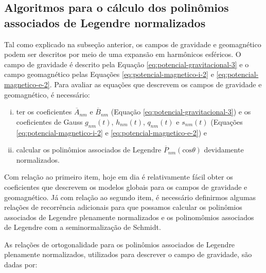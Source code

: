 \documentclass[10pt,a4paper,fleqn]{article}
\begin{document}
\subsection{Algoritmos para o c\'{a}lculo dos polin\^{o}mios associados de Legendre normalizados}

Tal como explicado na subse\c{c}\~{a}o anterior, os campos de gravidade e geomagn\'{e}tico
podem ser descritos por meio de uma expans\~{a}o em harm\^{o}nicos esf\'{e}ricos.
O campo de gravidade \'{e} descrito pela Equa\c{c}\~{a}o \ref{eq:potencial-gravitacional-3} e
o campo geomagn\'{e}tico pelas Equa\c{c}\~{o}es \ref{eq:potencial-magnetico-i-2} e
\ref{eq:potencial-magnetico-e-2}.
Para avaliar as equa\c{c}\~{o}es que descrevem os campos de gravidade e geomagn\'{e}tico, \'{e}
necess\'{a}rio:  

\begin{enumerate}[(i)]

\item ter os coeficientes $\overline{A}_{nm}$ e $\overline{B}_{nm}$ (Equa\c{c}\~{a}o 
\ref{eq:potencial-gravitacional-3}) e os coeficientes de Gauss
$g_{nm}(t)$, $h_{nm}(t)$, $q_{nm}(t)$ e $s_{nm}(t)$ 
(Equa\c{c}\~{o}es \ref{eq:potencial-magnetico-i-2} e \ref{eq:potencial-magnetico-e-2}) e

\item calcular os polin\^{o}mios associados de Legendre $\overline{P}_{nm}(\text{cos}\theta)$ 
devidamente normalizados.

\end{enumerate}

Com rela\c{c}\~{a}o ao primeiro item, hoje em dia \'{e} relativamente f\'{a}cil
obter os coeficientes que descrevem os modelos globais para os campos de gravidade
e geomagn\'{e}tico.
J\'{a} com rela\c{c}\~{a}o ao segundo item, \'{e} necess\'{a}rio definirmos algumas
rela\c{c}\~{o}es de recorr\^{e}ncia adicionais para que possamos calcular os polin\^{o}mios
associados de Legendre plenamente normalizados e os polinom\^{o}mios associados de
Legendre com a seminormaliza\c{c}\~{a}o de Schmidt.

As rela\c{c}\~{o}es de ortogonalidade para os polin\^{o}mios associados de Legendre 
plenamente normalizados, utilizados para descrever o campo de gravidade, s\~{a}o dadas
por:
\end{document}
